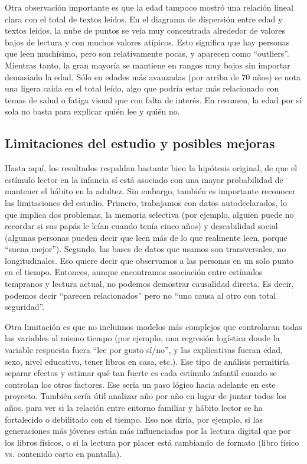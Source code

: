 \documentclass[aps,reprint]{revtex4-2}
\begin{document}
Otra observación importante es que la edad tampoco mostró una relación lineal clara con el total de textos leídos. En el diagrama de dispersión entre edad y textos leídos, la nube de puntos se veía muy concentrada alrededor de valores bajos de lectura y con muchos valores atípicos. Esto significa que hay personas que leen muchísimo, pero son relativamente pocas, y aparecen como “outliers”. Mientras tanto, la gran mayoría se mantiene en rangos muy bajos sin importar demasiado la edad. Sólo en edades más avanzadas (por arriba de 70 años) se nota una ligera caída en el total leído, algo que podría estar más relacionado con temas de salud o fatiga visual que con falta de interés. En resumen, la edad por sí sola no basta para explicar quién lee y quién no.

\subsection*{Limitaciones del estudio y posibles mejoras}

Hasta aquí, los resultados respaldan bastante bien la hipótesis original, de que el estímulo lector en la infancia sí está asociado con una mayor probabilidad de mantener el hábito en la adultez. Sin embargo, también es importante reconocer las limitaciones del estudio. Primero, trabajamos con datos autodeclarados, lo que implica dos problemas, la memoria selectiva (por ejemplo, alguien puede no recordar si sus papás le leían cuando tenía cinco años) y deseabilidad social (algunas personas pueden decir que leen más de lo que realmente leen, porque “suena mejor”). Segundo, las bases de datos que usamos son transversales, no longitudinales. Eso quiere decir que observamos a las personas en un solo punto en el tiempo. Entonces, aunque encontramos asociación entre estímulos tempranos y lectura actual, no podemos demostrar causalidad directa. Es decir, podemos decir “parecen relacionados” pero no “uno causa al otro con total seguridad”.

Otra limitación es que no incluimos modelos más complejos que controlaran todas las variables al mismo tiempo (por ejemplo, una regresión logística donde la variable respuesta fuera “lee por gusto sí/no”, y las explicativas fueran edad, sexo, nivel educativo, tener libros en casa, etc.). Ese tipo de análisis permitiría separar efectos y estimar qué tan fuerte es cada estímulo infantil cuando se controlan los otros factores. Ese sería un paso lógico hacia adelante en este proyecto. También sería útil analizar año por año en lugar de juntar todos los años, para ver si la relación entre entorno familiar y hábito lector se ha fortalecido o debilitado con el tiempo. Eso nos diría, por ejemplo, si las generaciones más jóvenes están más influenciadas por la lectura digital que por los libros físicos, o si la lectura por placer está cambiando de formato (libro físico vs. contenido corto en pantalla).
\end{document}
